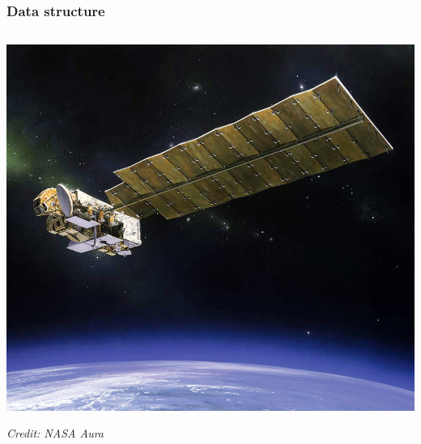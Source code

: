 \documentclass[aspectratio=169,t,xcolor=table]{beamer}
\begin{document}
\begin{frame}
  \frametitle{Data structure}
  \begin{columns}[t]
    \begin{column}{0.5\textwidth}
      \begin{center}
	\includegraphics[height=.4\textheight]{aura.jpg}

	{\footnotesize \textit{Credit: NASA Aura}}

	\vspace{5ex}


\end{center}
\end{column}
\end{columns}
\end{frame}
\end{document}

